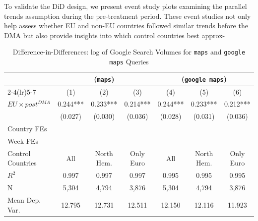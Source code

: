 \documentclass[11pt]{article}
\begin{document}
	To validate the DiD design, we present event study plots examining the parallel trends assumption during the pre-treatment period. These event studies not only help assess whether EU and non-EU countries followed similar trends before the DMA but also provide insights into which control countries best approx- 
	
	\clearpage
	
	\begin{table}
		\centering
		\def\sym#1{\ifmmode^{#1}\else\(^{#1}\)\fi}
		\caption{\label{tab:did} Difference-in-Differences: log of Google Search Volumes for \texttt{maps} and \texttt{google maps} Queries}
		\begin{threeparttable}
			\begin{tabular}{lcccccc}
				\hline \noalign{\smallskip} 
				& \multicolumn{3}{c}{(\texttt{maps})} & \multicolumn{3}{c}{(\texttt{google maps})}  \\ \cmidrule(lr){2-4}\cmidrule(lr){5-7}
				 
				&         (1)   &         (2)   &         (3)   &         (4)   &         (5)   &         (6)   \\
				\midrule
				$ EU \times post^{DMA} $ &       0.244***&       0.233***&       0.214***&       0.244***&       0.233***&       0.212***\\
				&     (0.027)   &     (0.030)   &     (0.036)   &     (0.028)   &     (0.031)   &     (0.036)   \\
				
				Country FEs         &  \checkmark   &  \checkmark   &  \checkmark   &  \checkmark   &  \checkmark   &  \checkmark   \\
				Week FEs            &  \checkmark   &  \checkmark   &  \checkmark   &  \checkmark   &  \checkmark   &  \checkmark   \\
				Control Countries    &         All   &  North Hem.   &   Only Euro   &         All   &  North Hem.   &   Only Euro   \\
				$ R ^2 $            &       0.997   &       0.997   &       0.997   &       0.995   &       0.995   &       0.995   \\
				N                   &       5,304   &       4,794   &       3,876   &       5,304   &       4,794   &       3,876   \\
				Mean Dep. Var.      &      12.795   &      12.731   &      12.511   &      12.150   &      12.116   &      11.923   \\
				\midrule
			\end{tabular}
			

\end{threeparttable}
\end{table}
\end{document}
